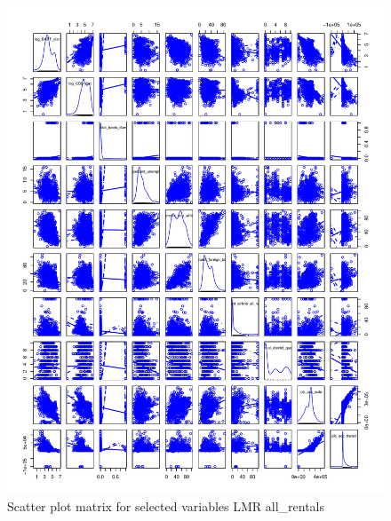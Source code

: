 \documentclass[10pt, letterpaper]{amsart}
\begin{document}
\begin{figure}[H]
  \caption{Scatter plot matrix for selected variables LMR all\_rentals}
  \includegraphics[scale=0.6]{spm_selected_LMR_allrentals}
\end{figure}
\end{document}
